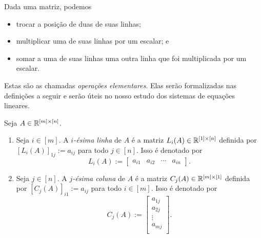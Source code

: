 Dada uma matriz, podemos 
    \begin{itemize}
        \item trocar a posição de duas de suas linhas;
        \item multiplicar uma de suas linhas por um escalar; e
        \item somar a uma de suas linhas uma outra linha que foi multiplicada por um escalar.
    \end{itemize}
Estas são as chamadas \emph{operações elementares}. Elas serão formalizadas nas definições a seguir e serão úteis no nosso estudo dos sistemas de equações lineares.

\begin{definition}
    Seja $A \in \mathbb{R}^{[m] \times [n]}$.
        \begin{enumerate}[leftmargin=*, align=left, label=\textbf{(\alph*)}]
            \item Seja $i \in [m]$. A \emph{$i$-ésima linha} de $A$ é a matriz $L_i(A) \in \mathbb{R}^{[1] \times [n]}$ definida por $[L_i(A)]_{1j} := a_{ij}$ para todo $j \in [n]$. Isso é denotado por
                \[
                    L_i (A):=
                        \begin{bmatrix}
                            a_{i1} & a_{i2} & \cdots & a_{in}
                        \end{bmatrix}.
                \]
            \item Seja $j \in [n]$. A \emph{$j$-ésima coluna} de $A$ é a matriz $C_j(A) \in \mathbb{R}^{[m] \times [1]}$ definida por $[C_j(A)]_{i1} := a_{ij}$ para todo $i \in [m]$. Isso é denotado por
                \[
                    C_j(A) :=
                        \begin{bmatrix}
                            a_{1j} \\
                            a_{2j} \\
                            \vdots \\
                            a_{mj} \\
                        \end{bmatrix}.
                \]
        \end{enumerate}
\end{definition}

